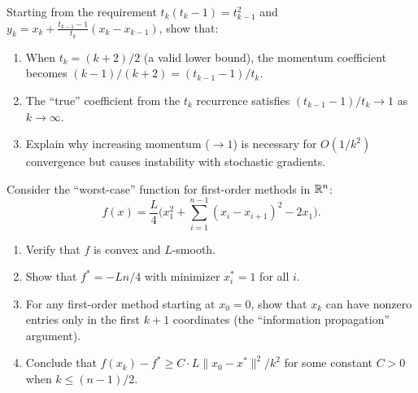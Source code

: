 \documentclass[11pt,a4paper]{article}
\begin{document}
\begin{exercise}\label{ex:momentum-coeff}
Starting from the requirement $t_k(t_k - 1) = t_{k-1}^2$ and
$y_k = x_k + \frac{t_{k-1}-1}{t_k}(x_k - x_{k-1})$, show that:
\begin{enumerate}[label=(\alph*)]
  \item When $t_k = (k+2)/2$ (a valid lower bound), the momentum
    coefficient becomes $(k-1)/(k+2) = (t_{k-1}-1)/t_k$.
  \item The ``true'' coefficient from the $t_k$ recurrence satisfies
    $(t_{k-1}-1)/t_k \to 1$ as $k \to \infty$.
  \item Explain why increasing momentum ($\to 1$) is necessary for
    $O(1/k^2)$ convergence but causes instability with stochastic
    gradients.
\end{enumerate}
\end{exercise}

\begin{exercise}\label{ex:lower-bound-construction}
Consider the ``worst-case'' function for first-order methods in $\mathbb{R}^n$:
\[
  f(x) = \frac{L}{4}\biggl(x_1^2 + \sum_{i=1}^{n-1}(x_i - x_{i+1})^2
  - 2x_1\biggr).
\]
\begin{enumerate}[label=(\alph*)]
  \item Verify that $f$ is convex and $L$-smooth.
  \item Show that $f^* = -Ln/4$ with minimizer $x^*_i = 1$ for all $i$.
  \item For any first-order method starting at $x_0 = 0$, show that
    $x_k$ can have nonzero entries only in the first $k+1$ coordinates
    (the ``information propagation'' argument).
  \item Conclude that $f(x_k) - f^* \ge C \cdot L\|x_0-x^*\|^2/k^2$
    for some constant $C > 0$ when $k \le (n-1)/2$.
\end{enumerate}
\end{exercise}


\end{document}
